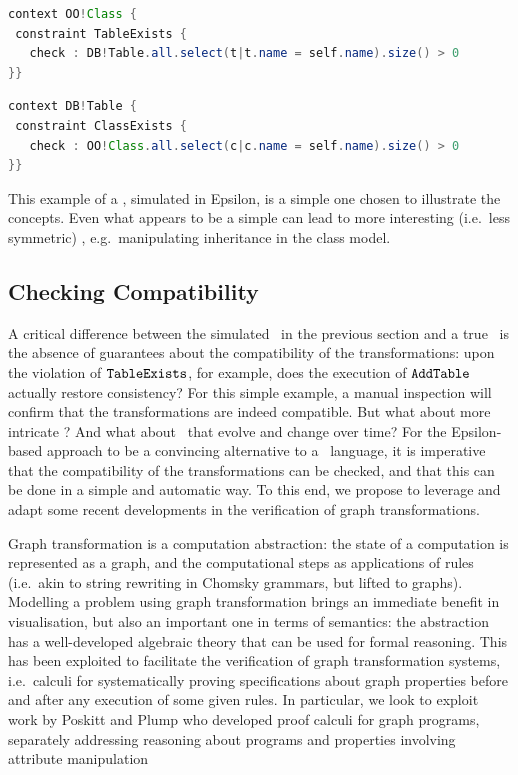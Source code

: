 		\begin{lstlisting}[language=java]
context OO!Class {
 constraint TableExists {
   check : DB!Table.all.select(t|t.name = self.name).size() > 0
}}	
		 \end{lstlisting}
		\hspace{7pt}
		\begin{lstlisting}[language=java]
context DB!Table {
 constraint ClassExists {
   check : OO!Class.all.select(c|c.name = self.name).size() > 0
}}
		\end{lstlisting}

This example of a \BX,  simulated in Epsilon, is a simple one chosen to illustrate the concepts. Even what appears to be a simple \BX can lead to more interesting (i.e.\ less symmetric) \BX, e.g.\ manipulating inheritance in the class model.

\subsection{Checking Compatibility}
A critical difference between the simulated \BX\ in the previous section and a true \BX\ is the absence of guarantees about the compatibility of the transformations: upon the violation of $\tt TableExists$, for example, does the execution of $\tt AddTable$ actually restore consistency? For this simple example, a manual inspection will confirm that the transformations are indeed compatible. But what about more intricate \BX? And what about \BX\ that evolve and change over time? For the Epsilon-based approach to be a convincing alternative to a \BX\ language, it is imperative that the compatibility of the transformations can be checked, and that this can be done in a simple and automatic way. To this end, we propose to leverage and adapt some recent developments in the verification of graph transformations.
	
	Graph transformation is a computation abstraction: the state of a computation is represented as a graph, and the computational steps as applications of rules (i.e.\ akin to string rewriting in Chomsky grammars, but lifted to graphs). Modelling a problem using graph transformation brings an immediate benefit in visualisation, but also an important one in terms of semantics: the abstraction has a well-developed algebraic theory that can be used for formal reasoning. This has been exploited to facilitate the verification of graph transformation systems, i.e.\ calculi for systematically proving specifications about graph properties before and after any execution of some given rules. In particular, we look to exploit work by Poskitt and Plump who developed proof calculi for graph programs, separately addressing reasoning about programs and properties involving attribute manipulation \cite{Poskitt13a,Poskitt-Plump12a}

